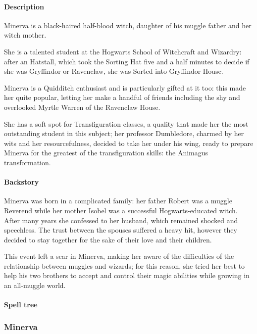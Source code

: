 
\paragraph{Description}
Minerva is a black-haired half-blood witch, daughter of his muggle father and her witch mother.

She is a talented student at the Hogwarts School of Witchcraft and Wizardry: after an Hatstall, which took the Sorting Hat five and a half minutes to decide if she was Gryffindor or Ravenclaw, she was Sorted into Gryffindor House. 

Minerva is a Quidditch enthusiast and is particularly gifted at it too: this made her quite popular, letting her make a handful of friends including the shy and overlooked Myrtle Warren of the Ravenclaw House.

She has a soft spot for Transfiguration classes, a quality that made her the most outstanding student in this subject; her professor Dumbledore, charmed by her wits and her resourcefulness, decided to take her under his wing, ready to prepare Minerva for the greatest of the transfiguration skills: the Animagus transformation.

\paragraph{Backstory}
Minerva was born in a complicated family: her father Robert was a muggle Reverend while her mother Isobel was a successful Hogwarts-educated witch. After many years she confessed to her husband, which remained shocked and speechless. The trust between the spouses suffered a heavy hit, however they decided to stay together for the sake of their love and their children.

This event left a scar in Minerva, making her aware of the difficulties of the relationship between muggles and wizards; for this reason, she tried her best to help his two brothers to accept and control their magic abilities while growing in an all-muggle world.
\pagebreak 

\pagebreak 
{} 

\paragraph{Spell tree }
\subsubsection{Minerva}

\clearpage
